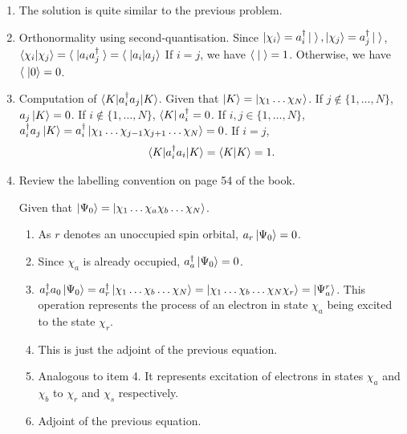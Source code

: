 \begin{enumerate}
$\{a_1^\dagger, a_2^\dagger\}\ket{\chi_2\chi_4} = \ket{\chi_1\chi_2\chi_2\chi_4}
+ \ket{\chi_2\chi_1\chi_2\chi_4} = 0 + 0$.

\[
\begin{aligned}
\{a_1^\dagger, a_2^\dagger\}\ket{\chi_3\chi_4} &= \ket{\chi_1\chi_2\chi_3\chi_4}
+ \ket{\chi_2\chi_1\chi_3\chi_4} \\
& = \ket{\chi_1\chi_2\chi_3\chi_4} - \ket{\chi_1\chi_2\chi_3\chi_4} 
&= 0.
\end{aligned}
\]

\item\label{c2p25} The solution is quite similar to the previous problem.

\item\label{c2p26} Orthonormality using second-quantisation.
Since $\ket{\chi_i} = a_i^\dagger\ket{\;}, \ket{\chi_j} = a_j^\dagger\ket{\;}$,
$\braket{\chi_i|\chi_j} = \braket{\;|a_ia_j^\dagger\;} = \braket{\;|a_i|a_j}$
If $i = j$, we have $\braket{\;|\;} = 1$. Otherwise, we have $\braket{\;|0} = 0$.

\item\label{c2p27} Computation of $\braket{K|a_i^\dagger a_j|K}$.
Given that $\ket{K} = \ket{\chi_1\ldots\chi_N}$. If $j \notin \{1, \ldots, N\}$,
$a_j\ket{K} = 0$. If $i \notin \{1, \ldots, N\}$, $\bra{K}a_i^\dagger = 0$. If
$i, j \in \{1, \ldots, N\}$, $a_i^\dagger a_j\ket{K} = a_i^\dagger\ket{\chi_1
\ldots\chi_{j-1}\chi_{j+1}\ldots\chi_N} = 0$. If $i = j$,
\[
\braket{K|a_i^\dagger a_i|K} = \braket{K|K} = 1.
\]

\item\label{c2p28} Review the labelling convention on page 54 of the book.

Given that $\ket{\Psi_0} = \ket{\chi_1\ldots\chi_a\chi_b\ldots\chi_N}$.
\begin{enumerate}
\item As $r$ denotes an unoccupied spin orbital, $a_r\ket{\Psi_0} = 0$.
\item Since $\chi_a$ is already occupied, $a_a^\dagger\ket{\Psi_0} = 0$.
\item $a_r^\dagger a_0\ket{\Psi_0} = a_r^\dagger\ket{\chi_1\ldots\chi_b\ldots
\chi_N} = \ket{\chi_1\ldots\chi_b\ldots\chi_N\chi_r} = \ket{\Psi_a^r}$. This 
operation represents the process of an electron in state $\chi_a$ being excited
to the state $\chi_r$.
\item This is just the adjoint of the previous equation.
\item Analogous to item 4. It represents excitation of electrons in states 
$\chi_a$ and $\chi_b$ to $\chi_r$ and $\chi_s$ respectively.
\item Adjoint of the previous equation.
\end{enumerate}


\end{enumerate}

